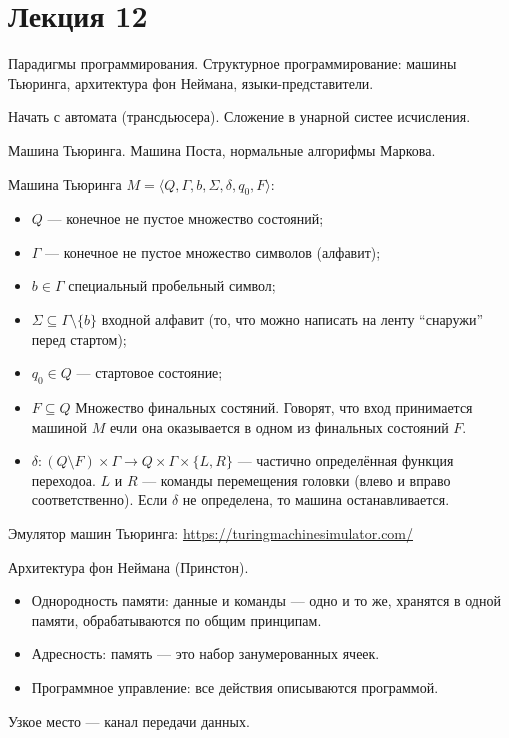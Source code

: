 \section{Лекция 12}
 
Парадигмы программирования. Структурное программирование: машины Тьюринга, архитектура фон Неймана, языки-представители.

Начать с автомата (трансдьюсера). Сложение в унарной систее исчисления.

Машина Тьюринга. Машина Поста, нормальные алгорифмы Маркова.

Машина Тьюринга $M=\langle Q,\Gamma ,b,\Sigma ,\delta ,q_{0},F\rangle$:
\begin{itemize}
\item $Q$ --- конечное не пустое множество состояний;
\item $\Gamma$  --- конечное не пустое  множество символов (алфавит);
\item $b \in \Gamma$  специальный пробельный символ;
\item $ \Sigma \subseteq \Gamma \setminus \{b\}$ входной алфавит (то, что можно написать на ленту ``снаружи'' перед стартом);
\item $q_{0}\in Q$ --- стартовое состояние;
\item $F\subseteq Q$ Множество финальных состяний. Говорят, что вход принимается машиной $M$ ечли она оказывается в одном из финальных состояний $F$.
\item $ \delta :(Q\setminus F)\times \Gamma \to Q\times \Gamma \times \{L,R\}$ --- частично определённая функция переходоа. $L$ и $R$ --- команды перемещения головки (влево и вправо соответственно). Если $\delta$  не определена, то машина останавливается.
\end{itemize}

Эмулятор машин Тьюринга: \url{https://turingmachinesimulator.com/}

Архитектура фон Неймана (Принстон). 
\begin{itemize}
	\item Однородность памяти: данные и команды --- одно и то же, хранятся в одной памяти, обрабатываются по общим принципам.
	\item Адресность: память --- это набор занумерованных ячеек.
	\item Программное управление: все действия описываются программой.
\end{itemize}

Узкое место --- канал передачи данных.

